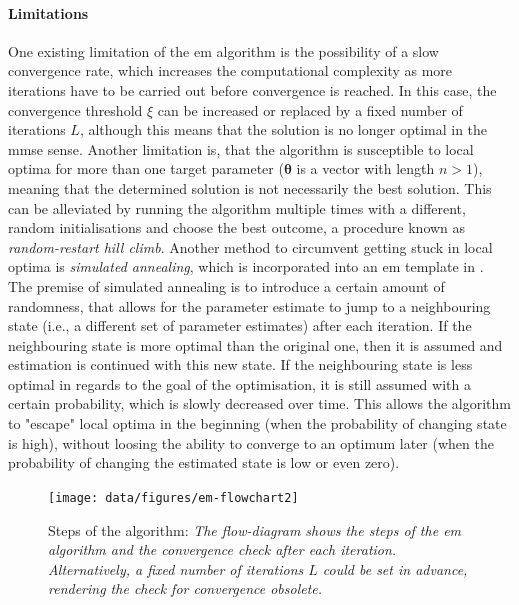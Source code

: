 \paragraph{Limitations}
One existing limitation of the \gls{em} algorithm is the possibility of a slow convergence rate, which increases the computational complexity as more iterations have to be carried out before convergence is reached. In this case, the convergence threshold $\xi$ can be increased or replaced by a fixed number of iterations $L$, although this means that the solution is no longer optimal in the \gls{mmse} sense. Another limitation is, that the algorithm is susceptible to local optima for more than one target parameter ($\bm\theta$ is a vector with length $n>1$), meaning that the determined solution is not necessarily the best solution. This can be alleviated by running the algorithm multiple times with a different, random initialisations and choose the best outcome, a procedure known as \textit{random-restart hill climb}. Another method to circumvent getting stuck in local optima is \textit{simulated annealing}, which is incorporated into an \gls{em} template in \cite{Guo2007}. The premise of simulated annealing is to introduce a certain amount of randomness, that allows for the parameter estimate to jump to a neighbouring state (i.e., a different set of parameter estimates) after each iteration. If the neighbouring state is more optimal than the original one, then it is assumed and estimation is continued with this new state. If the neighbouring state is less optimal in regards to the goal of the optimisation, it is still assumed with a certain probability, which is slowly decreased over time. This allows the algorithm to "escape" local optima in the beginning (when the probability of changing state is high), without loosing the ability to converge to an optimum later (when the probability of changing the estimated state is low or even zero).

\begin{figure}[!bh]
    \texttt{[image: data/figures/em-flowchart2]}
    \caption[Steps of the  algorithm]{Steps of the  algorithm: \itshape The flow-diagram shows the steps of the \gls{em} algorithm and the convergence check after each iteration. Alternatively, a fixed number of iterations $L$ could be set in advance, rendering the check for convergence obsolete.}
\end{figure}




